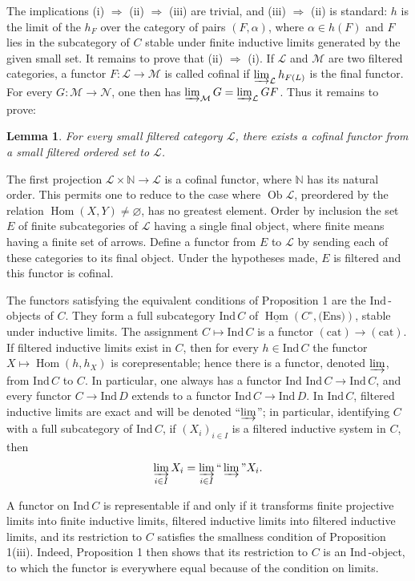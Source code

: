 \documentclass[12pt]{amsart}
\theoremstyle{plain}
\newtheorem{lem}{Lemma}
\theoremstyle{definition}
\DeclareMathOperator{\Hom}{Hom}
\newcommand{\Ind}{\text{Ind}\,}
\newcommand{\cL}{\mathcal{L}}
\newcommand{\cM}{\mathcal{M}}
\newcommand{\cN}{\mathcal{N}}
\newcommand{\cD}{D}
\begin{document}
The implications (i) $\Rightarrow$ (ii) $\Rightarrow$ (iii) are trivial, and (iii) $\Rightarrow$ (ii) is standard: $h$ is the limit of the $h_F$ over the category of pairs $(F,\alpha)$, where $\alpha\in h(F)$ and $F$ lies in the subcategory of $C$ stable under finite inductive limits generated by the given small set. It remains to prove that (ii) $\Rightarrow$ (i). If $\cL$ and $\cM$ are two filtered categories, a functor $F:\cL\to\cM$ is called cofinal if $\varinjlim_{\cL} h_{F(L)}$ is the final functor. For every $G:\cM\to\cN$, one then has $\varinjlim_{\cM}G=\varinjlim_{\cL}GF$. Thus it remains to prove:

\begin{lem}
For every small filtered category $\cL$, there exists a cofinal functor from a small filtered ordered set to $\cL$.
\end{lem}

The first projection $\cL\times\mathbb{N}\to\cL$ is a cofinal functor, where $\mathbb{N}$ has its natural order. This permits one to
reduce to the case where $\operatorname{Ob}\cL$, preordered by the relation $\Hom(X,Y)\ne\varnothing$, has no greatest element. Order by inclusion the set $E$ of finite subcategories of $\cL$ having a single final object, where finite means having a finite set of arrows. Define a functor from $E$ to $\cL$ by sending each of these categories to its final object. Under the hypotheses made, $E$ is filtered and this functor is cofinal.

The functors satisfying the equivalent conditions of Proposition 1 are the $\Ind$-objects of $C$. They form a full subcategory $\Ind C$ of $\underline{\Hom}(C^{\circ},\text{(Ens)})$, stable under inductive limits. The assignment $C\mapsto\Ind C$ is a functor $(\text{cat})\to(\text{cat})$. If filtered inductive limits exist in $C$, then for every $h\in\Ind C$ the functor $X\mapsto\Hom(h,h_X)$ is corepresentable; hence there is a functor, denoted $\varinjlim$, from $\Ind C$ to $C$. In particular, one always has a functor $\Ind\,\Ind C\to\Ind C$, and every functor $C\to\Ind\cD$ extends to a functor $\Ind C\to\Ind\cD$. In $\Ind C$, filtered inductive limits are exact and will be denoted ``$\varinjlim$''; in particular, identifying $C$ with a full subcategory of $\Ind C$, if $(X_i)_{i\in I}$ is a filtered inductive system in $C$, then
\[
\varinjlim_{i\in I}X_i=\varinjlim_{i\in I}\text{``}\varinjlim\text{''}X_i.
\]

A functor on $\Ind C$ is representable if and only if it transforms finite projective limits into finite inductive limits, filtered inductive limits into filtered inductive limits, and its restriction to $C$ satisfies the smallness condition of Proposition 1(iii). Indeed, Proposition 1 then shows that its restriction to $C$ is an $\Ind$-object, to which the functor is everywhere equal because of the condition on limits.
\end{document}
